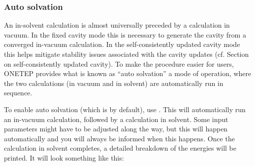 \documentclass[letterpaper,10pt,english]{sphinxmanual}
\begin{document}
\subsubsection{Auto solvation}
\label{\detokenize{implicit_solvation_v3:auto-solvation}}
An in-solvent calculation is almost universally preceded by a
calculation in vacuum. In the fixed cavity mode this is necessary to
generate the cavity from a converged in-vacuum calculation. In the
self-consistently updated cavity mode this helps mitigate stability
issues associated with the cavity updates (cf. Section on self-consistently updated cavity).
To make the procedure easier for users, ONETEP provides what is known as
“auto solvation” \textendash{} a mode of operation, where the two calculations (in
vacuum and in solvent) are automatically run in sequence.

\begin{DUlineblock}{0em}
\item[] To enable auto solvation (which is  by default), use
. This will automatically run an in-vacuum
calculation, followed by a calculation in solvent. Some input
parameters might have to be adjusted along the way, but this will
happen automatically and you will always be informed when this
happens. Once the calculation in solvent completes, a detailed
breakdown of the energies will be printed. It will look something like
this:
\end{DUlineblock}
\end{document}
